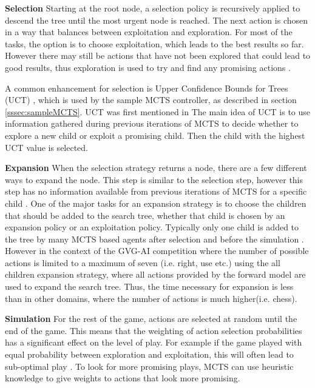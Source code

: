 \documentclass[journal]{IEEEtran}
\begin{document}
		\textbf{Selection}
			Starting at the root node, a selection policy is recursively applied to descend the tree until the most urgent node is reached. 
			The next action is chosen in a way that balances between exploitation and exploration. For most of the tasks, the option is to choose exploitation, which leads to the best results so far. However there may still be actions that have not been explored that could lead to good results, thus exploration is used to try and find any promising actions \cite{chaslot2008monte}.
			
			A common enhancement for selection is Upper Confidence Bounds for Trees (UCT) \cite{bravi2017evolving}, which is used by the sample MCTS controller, as described in section \ref{sssec:sampleMCTS}. 
			UCT was first mentioned in \cite{kocsis2006bandit}
			The main idea of UCT is to use information gathered during previous iterations of MCTS to decide whether to explore a new child or exploit a promising child. Then the child with the highest UCT value is selected. 
		
		\textbf{Expansion}
			When the selection strategy returns a node, there are a few different ways to expand the node. This step is similar to the selection step, however this step has no information available from previous iterations of MCTS for a specific child \cite{schuster2015mcts}. 
			One of the major tasks for an expansion strategy is to choose the children that should be added to the search tree, whether that child is chosen by an expansion policy or an exploitation policy.
			Typically only one child is added to the tree by many MCTS based agents after selection and before the simulation \cite{chaslot2008monte, schuster2015mcts}. However in the context of the GVG-AI competition where the number of possible actions is limited to a maximum of seven (i.e. right, use etc.) using the all children expansion strategy, where all actions provided by the forward model are used to expand the search tree. Thus, the time necessary for expansion is less than in other domains, where the number of actions is much higher(i.e. chess).
			

		\textbf{Simulation}
			For the rest of the game, actions are selected at random until the end of the game. This means that the weighting of action selection probabilities has a significant effect on the level of play. For example if the game played with equal probability between exploration and exploitation, this will often lead to sub-optimal play \cite{chaslot2008monte}. To look for more promising plays, MCTS can use heuristic knowledge to give weights to actions that look more promising.
\end{document}
